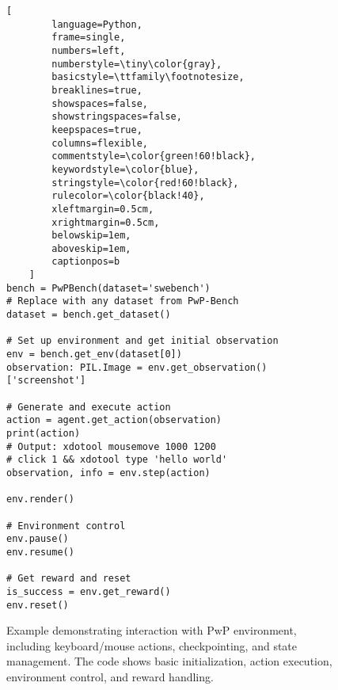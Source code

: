 \begin{figure}[t]
    \begin{lstlisting}[
        language=Python,
        frame=single,
        numbers=left,
        numberstyle=\tiny\color{gray},
        basicstyle=\ttfamily\footnotesize,
        breaklines=true,
        showspaces=false,
        showstringspaces=false,
        keepspaces=true,
        columns=flexible,
        commentstyle=\color{green!60!black},
        keywordstyle=\color{blue},
        stringstyle=\color{red!60!black},
        rulecolor=\color{black!40},
        xleftmargin=0.5cm,
        xrightmargin=0.5cm,
        belowskip=1em,
        aboveskip=1em,
        captionpos=b
    ]
bench = PwPBench(dataset='swebench')  
# Replace with any dataset from PwP-Bench
dataset = bench.get_dataset()

# Set up environment and get initial observation
env = bench.get_env(dataset[0])
observation: PIL.Image = env.get_observation()['screenshot']

# Generate and execute action
action = agent.get_action(observation)
print(action)
# Output: xdotool mousemove 1000 1200 
# click 1 && xdotool type 'hello world'
observation, info = env.step(action)

env.render()

# Environment control
env.pause()
env.resume()

# Get reward and reset
is_success = env.get_reward()
env.reset()
    \end{lstlisting}
    \caption{Example demonstrating interaction with PwP environment, including keyboard/mouse actions, checkpointing, and state management. The code shows basic initialization, action execution, environment control, and reward handling.}
    \label{lst:pwp_example}
\end{figure} 
